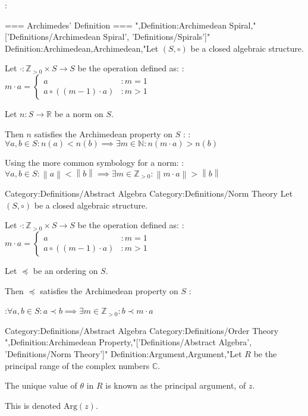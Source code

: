:


=== Archimedes' Definition ===
",Definition:Archimedean Spiral,"['Definitions/Archimedean Spiral', 'Definitions/Spirals']"
Definition:Archimedean,Archimedean,"Let $\left( S, \circ \right)$ be a closed algebraic structure.

Let $\cdot: \mathbb Z_{>0} \times S \to S$ be the operation defined as:
:$m \cdot a = \begin{cases}
a & : m = 1 \\
a \circ \left( \left( m - 1 \right) \cdot a \right) & : m > 1 \end {cases}$


Let $n: S \to \mathbb R$ be a norm on $S$.



Then $n$ satisfies the Archimedean property on $S$ :
:$\forall a, b \in S: n \left( a \right) < n \left( b \right) \implies \exists m \in \mathbb N: n \left( m \cdot a \right) > n \left( b \right)$


Using the more common symbology for a norm:
:$\forall a, b \in S: \left\lVert a \right\rVert < \left\lVert b \right\rVert \implies \exists m \in \mathbb Z_{>0}: \left\lVert m \cdot a \right\rVert > \left\lVert b \right\rVert$


Category:Definitions/Abstract Algebra
Category:Definitions/Norm Theory
Let $\left( S, \circ \right)$ be a closed algebraic structure.

Let $\cdot: \mathbb Z_{>0} \times S \to S$ be the operation defined as:
:$m \cdot a = \begin{cases}
a & : m = 1 \\
a \circ \left( \left( m - 1 \right) \cdot a \right) & : m > 1 \end {cases}$


Let $\preceq$ be an ordering on $S$.


Then $\preceq$ satisfies the Archimedean property on $S$ :

:$\forall a, b \in S: a \prec b \implies \exists m \in \mathbb Z_{>0}: b \prec m \cdot a$


Category:Definitions/Abstract Algebra
Category:Definitions/Order Theory
",Definition:Archimedean Property,"['Definitions/Abstract Algebra', 'Definitions/Norm Theory']"
Definition:Argument,Argument,"Let $R$ be the principal range of the complex numbers $\mathbb C$.

The unique value of $\theta$ in $R$ is known as the principal argument, of $z$.

This is denoted $\mathrm {Arg} \left( z \right)$.


